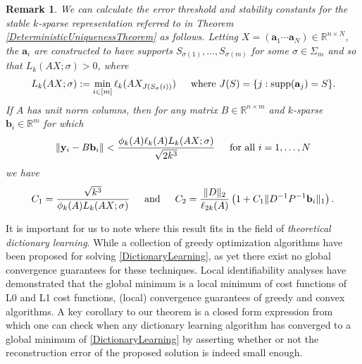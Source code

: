\documentclass[journal, onecolumn]{IEEEtran}
\newtheorem{remark}{Remark}
\begin{document}

\begin{remark}\label{thm1specs}
We can calculate the error threshold and stability constants for the stable $k$-sparse representation referred to in Theorem \ref{DeterministicUniquenessTheorem} as follows. Letting $X  = (\mathbf{a}_1 \cdots \mathbf{a}_N) \in \mathbb{R}^{n \times N}$, the $\mathbf{a}_i$ are constructed to have supports $S_{\sigma(1)}, \ldots, S_{\sigma(m)}$ for some $\sigma \in \Sigma_m$ and so that $L_k(AX;\sigma) > 0$, where
\begin{align}\label{Ldef}
L_k(AX;\sigma) := \min_{i \in [m]} \ell_k(AX_{J(S_\sigma(i))}) \indent \text{where } J(S) = \{j : \text{supp}(\mathbf{a}_j) = S\}.
\end{align}
If $A$ has unit norm columns, then for any matrix $B \in \mathbb{R}^{n \times m}$ and $k$-sparse $\mathbf{b}_i \in \mathbb{R}^m$ for which
\begin{align}\label{ErrorBound}
\|\mathbf{y}_i - B\mathbf{b}_i\| < \frac{ \phi_k(A) \ell_{k}(A) L_k(AX;\sigma) }{\sqrt{2k^3} } \indent \text{for all } i = 1, \ldots, N
\end{align}
%
we have
\begin{align}
C_1 = \frac{\sqrt{k^3}}{\phi_k(A)L_k(AX;\sigma)} 
\indent \text{and} \indent 
C_2 = \frac{ \|D\|_2}{\ell_{2k}(A)}  \left( 1 + C_1\|D^{-1}P^{-1}\mathbf{b}_i\|_1 \right).
\end{align}
\end{remark}

It is important for us to note where this result fits in the field of \emph{theoretical dictionary learning}. While a collection of greedy optimization algorithms have been proposed for solving \eqref{DictionaryLearning}, as yet there exist no global convergence guarantees for these techniques. Local identifiability analyses have demonstrated that the global minimum is a local minimum of cost functions of L0 and L1 cost functions, (local) convergence guarantees of greedy and convex algorithms. A key corollary to our theorem is a closed form expression from which one can check when any dictionary learning algorithm has converged to a global minimum of \eqref{DictionaryLearning} by asserting whether or not the reconstruction error of the proposed solution is indeed small enough. 
\end{document}
